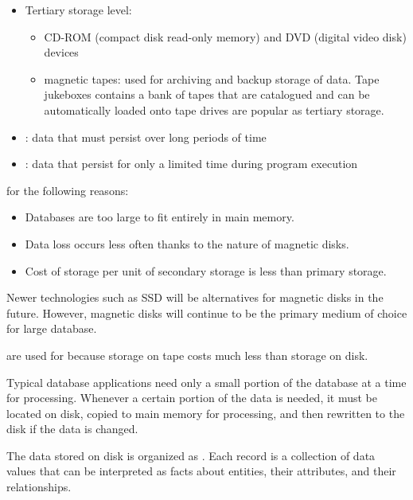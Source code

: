 \begin{itemize}
\begin{itemize}
              \item Tertiary storage level:
              \begin{itemize}
                \item CD-ROM (compact disk read-only memory) and DVD (digital video disk) devices
                \item magnetic tapes: used for archiving and backup storage of data. Tape jukeboxes contains a bank of tapes that are catalogued and can be automatically loaded onto tape drives are popular as tertiary storage.
              \end{itemize}
            \end{itemize}
      \end{itemize}

    \begin{itemize}
      \item {}: data that must persist over long periods of time
      \item {}: data that persist for only a limited time during program execution
    \end{itemize}

      \par {} for the following reasons:
        \begin{itemize}
          \item Databases are too large to fit entirely in main memory.
          \item Data loss occurs less often thanks to the  nature of magnetic disks.
          \item Cost of storage per unit of secondary storage is less than primary storage.
        \end{itemize}
      \par Newer technologies such as SSD will be alternatives for magnetic disks in the future. However, magnetic disks will continue to be the primary medium of choice for large database.

      \par {} are used for  because storage on tape costs much less than storage on disk.

      \par Typical database applications need only a small portion of the database at a time for processing. Whenever a certain portion of the data is needed, it must be located on disk, copied to main memory for processing, and then rewritten to the disk if the data is changed.
      \par The data stored on disk is organized as . Each record is a collection of data values that can be interpreted as facts about entities, their attributes, and their relationships.


